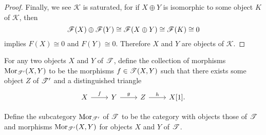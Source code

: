 \documentclass[dissertation.tex]{subfiles}
\begin{document}
\begin{lem}
\begin{proof}
      Finally, we see $\mathscr{K}$ is saturated, for if $X \oplus Y$ is isomorphic to some object $K$ of $\mathscr{K}$, then 
      $$\mathscr{F}(X) \oplus \mathscr{F}(Y) \cong \mathscr{F}(X \oplus Y) \cong \mathscr{F}(K) \cong 0$$
      implies $F(X) \cong 0$ and $F(Y) \cong 0$.
      Therefore $X$ and $Y$ are objects of $\mathscr{K}$.
  \end{proof}
\end{lem}

\begin{defn}[\cite{NeemanTCats}]
  For any two objects $X$ and $Y$ of $\mathscr{T}$, define the collection of morphisms $\operatorname{Mor}_{\mathscr{T}^\prime}(X,Y)$ to be the morphisms $f \in \mathscr{T}(X,Y)$ such that there exists some object $Z$ of $\mathscr{T}^\prime$ and a distinguished triangle
  $$\begin{tikzcd}
    X \arrow{r}{f} & Y \arrow{r}{g} & Z \arrow{r}{h} & X[1].
  \end{tikzcd}$$
\end{defn}

\begin{defn}[\cite{NeemanTCats}]
  Define the subcategory $\operatorname{Mor}_{\mathscr{T}^\prime}$ of $\mathscr{T}$ to be the category with objects those of $\mathscr{T}$ and morphisms $\operatorname{Mor}_{\mathscr{T}^\prime}(X,Y)$ for objects $X$ and $Y$ of $\mathscr{T}$.
\end{defn}
\end{document}
